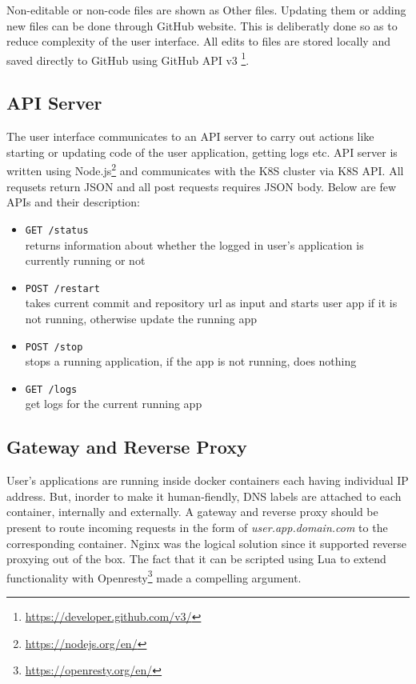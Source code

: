 \documentclass[DD]{iitmdiss}
\begin{document}
Non-editable or non-code files are shown as Other files. Updating them or adding new files can be done through GitHub website. This is deliberatly done so as to reduce complexity of the user interface. All edits to files are stored locally and saved directly to GitHub using GitHub API v3 \footnote{\url{https://developer.github.com/v3/}}.

\subsection{API Server}
The user interface communicates to an API server to carry out actions like starting or updating code of the user application, getting logs etc. API server is written using Node.js\footnote{\url{https://nodejs.org/en/}} and communicates with the K8S cluster via K8S API. All requsets return JSON and all post requests requires JSON body. Below are few APIs and their description:
\begin{itemize}
	\item \verb|GET /status| \\
		returns information about whether the logged in user's application is currently running or not
	\item \verb|POST /restart| \\
		takes current commit and repository url as input and starts user app if it is not running, otherwise update the running app
	\item \verb|POST /stop| \\
		stops a running application, if the app is not running, does nothing
	\item \verb|GET /logs| \\
		get logs for the current running app
\end{itemize}

\subsection{Gateway and Reverse Proxy}
User's applications are running inside docker containers each having individual IP address. But, inorder to make it human-fiendly, DNS labels are attached to each container, internally and externally. A gateway and reverse proxy should be present to route incoming requests in the form of \textit{user.app.domain.com} to the corresponding container. Nginx was the logical solution since it supported reverse proxying out of the box. The fact that it can be scripted using Lua to extend functionality with Openresty\footnote{\url{https://openresty.org/en/}} made a compelling argument.
\end{document}
